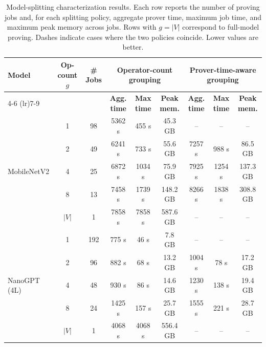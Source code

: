 

\begin{table}[t]
\centering
\small
\setlength{\tabcolsep}{5pt}
\renewcommand{\arraystretch}{1.18}
\begin{tabular}{l c c c c c c c c}
\toprule
\multirow{2}{*}{\textbf{Model}} &
\multirow{2}{*}{\textbf{Op-count \(g\)}} &
\multirow{2}{*}{\textbf{\# Jobs}} &
\multicolumn{3}{c}{\textbf{Operator-count grouping}} &
\multicolumn{3}{c}{\textbf{Prover-time-aware grouping}} \\
\cmidrule(lr){4-6}
\cmidrule(lr){7-9}
&
&
&
\textbf{Agg. time} &
\textbf{Max time} &
\textbf{Peak mem.} &
\textbf{Agg. time} &
\textbf{Max time} &
\textbf{Peak mem.} \\
\midrule

\multirow{5}{*}{MobileNetV2}
  & 1       & 98  & 5362 s & 455 s  & 45.3 GB  & --      & --     & -- \\
  & 2       & 49  & 6241 s          & 733 s  & 55.6 GB  & 7257 s  & 988 s  & 86.5 GB \\
  & 4       & 25  & 6872 s          & 1034 s & 75.9 GB  & 7925 s  & 1254 s & 137.3 GB \\
  & 8       & 13  & 7458 s          & 1739 s & 148.2 GB & 8266 s  & 1838 s & 308.8 GB \\
  & $|V|$   & 1   & 7858 s          & 7858 s & 587.6 GB & --      & --     & -- \\
\midrule

\multirow{5}{*}{NanoGPT (4L)}
  & 1       & 192 & 775 s  & 46 s   & 7.8 GB   & --      & --     & -- \\
  & 2       & 96  & 882 s           & 68 s   & 13.2 GB  & 1004 s  & 78 s   & 17.2 GB \\
  & 4       & 48  & 930 s           & 86 s   & 14.6 GB  & 1230 s  & 138 s  & 19.4 GB \\
  & 8       & 24  & 1425 s          & 157 s  & 25.7 GB  & 1555 s  & 221 s  & 28.7 GB \\
  & $|V|$   & 1   & 4068 s          & 4068 s & 556.4 GB & --      & --     & -- \\
\bottomrule
\end{tabular}
\caption{
Model-splitting characterization results. Each row reports the number of proving jobs and, for each splitting policy, aggregate prover time, maximum job time, and maximum peak memory across jobs. Rows with \(g=|V|\) correspond to full-model proving. Dashes indicate cases where the two policies coincide. Lower values are better.
}
\label{tab:model-splitting-results}
\end{table}

